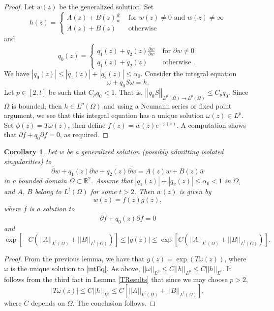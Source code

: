 \documentclass[12pt,reqno]{amsart}
\theoremstyle{plain}
\newtheorem{cor}{Corollary}
\theoremstyle{definition}
\newcommand{\om}{\omega}
\newcommand{\Om}{\Omega}
\newcommand{\ol}{\overline}
\newcommand{\iny}{\infty}
\newcommand{\del}{ \partial}
\newcommand{\su}{\subset}
\newcommand{\norm}[1]{\left\vert \left\vert #1\right\vert\right\vert}
\newcommand{\abs}[1]{\left\vert#1\right\vert}
\newcommand{\brac}[1]{\left[#1\right]}
\newcommand{\pr}[1]{\left( #1 \right) }
\newcommand{\R}{\ensuremath{\mathbb{R}}}
\begin{document}
\begin{proof}
Let $w\pr{z}$ be the generalized solution.
Set
$$h\pr{z} = \left\{\begin{array}{ll} 
A\pr{z} + B\pr{z} \frac{\bar w}{w} & \text{ for } w\pr{z} \ne 0 \text{ and } w\pr{z} \ne \iny \\  
A\pr{z} + B\pr{z} & \text{ otherwise }
\end{array}\right.$$
and
\begin{equation*}
q_0\pr{z} = \left\{\begin{array}{ll} 
q_1\pr{z} + q_2\pr{z} \frac{\ol{\del w}}{\del w} & \text{ for } \del w \ne 0  \\  
q_1\pr{z} + q_2\pr{z} & \text{ otherwise }.
\end{array} \right.
\end{equation*}
We have $\abs{q_0\pr{z}} \le \abs{q_1\pr{z}} + \abs{q_2\pr{z}} \le \alpha_0$. Consider the integral equation
\begin{equation*}
\om + q_0 S \om = h.
\end{equation*}
Let $p \in \brac{2, t}$ be such that $C_p q_0 < 1$.
That is, $\norm{q_0 S}_{L^p\pr{\Om} \to L^p\pr{\Om}} \le C_p q_0$.
Since $\Om$ is bounded, then $h \in L^p\pr{\Omega}$ and using a Neumann series or fixed point argument, we see that this integral equation has a unique solution $\om\pr{z} \in L^p$.
Set $\phi\pr{z} = T \om\pr{z}$, then define $f\pr{z} = w\pr{z} e^{- \phi\pr{z}}$.
A computation shows that $\bar \del f + q_0 \del f = 0$, as required.
\end{proof}

\begin{cor}
Let $w$ be a generalized solution (possibly admitting isolated singularities) to
\begin{equation*}
\bar \del w + q_1\pr{z} \del w + q_2\pr{z} \ol{\del w} = A\pr{z} w + B\pr{z} \bar w
\end{equation*}
in a bounded domain $\Omega \su \R^2$.
Assume that $\abs{q_1\pr{z}} + \abs{q_2\pr{z}} \le \alpha_0 < 1$ in $\Om$, and $A$, $B$ belong to $L^t\pr{\Om}$ for some $t > 2$.
Then $w\pr{z}$ is given by
$$w\pr{z} = f\pr{z} g\pr{z},$$
where $f$ is a solution to
$$\bar \del f + q_0\pr{z} \del f = 0$$
and
$$\exp\brac{-C \pr{ \norm{A}_{L^t\pr{\Omega}} +  \norm{B}_{L^t\pr{\Omega}}}} \le \abs{g\pr{z}} \le \exp\brac{C \pr{ \norm{A}_{L^t\pr{\Omega}} +  \norm{B}_{L^t\pr{\Omega}}}}.$$
\label{simCor}
\end{cor}

\begin{proof}
From the previous lemma, we have that $g\pr{z} = \exp\pr{T \om \pr{z}}$, where $\om$ is the unique solution to \eqref{intEq}.
As above, $\norm{\om}_{L^p} \le C \norm{h}_{L^p} \le C \norm{h}_{L^t}$.
It follows from the third fact in Lemma \ref{TResults} that since we may choose $p > 2$,
$$\abs{T \om \pr{z}} \le C \norm{h}_{L^p} \le C \brac{\norm{A}_{L^t\pr{\Omega}} +  \norm{B}_{L^t\pr{\Omega}}},$$
where $C$ depends on $\Omega$.
The conclusion follows.
\end{proof}
\end{document}
